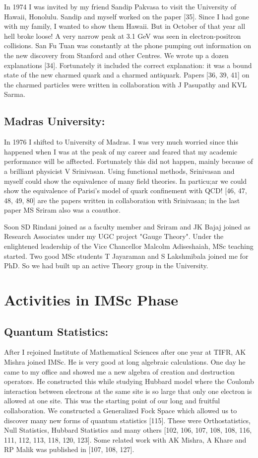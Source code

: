 In 1974 I was invited by my friend Sandip Pakvasa to visit the 
University of Hawaii, Honolulu. Sandip and myself worked on the paper 
[35]. Since I had gone with my family, I wanted to show them Hawaii. But 
in October of that year all hell broke loose! A very narrow peak at 3.1 
GeV was seen in electron-positron collisions. San Fu Tuan was constantly 
at the phone pumping out information on the new discovery from Stanford 
and other Centres. We wrote up a dozen explanations [34]. Fortunately it 
included the correct explanation: it was a bound state of the new 
charmed quark and a charmed antiquark. Papers [36, 39, 41] on the charmed 
particles were written in collaboration with J Pasupathy and KVL Sarma.

\subsection*{Madras University: }

In 1976 I shifted to University of Madras. I was very much worried since 
this happened when I was at the peak of my career and feared that my 
academic performance will be afftected. Fortunately this did not happen, 
mainly because of a brilliant physicist V Srinivasan. Using functional 
methods, Srinivasan and myself could show the equivalence of many field 
theories. In particu;ar we could show the equivalence of Parisi's model 
of quark confinement with QCD! [46, 47, 48, 49, 80] are the papers written 
in collaboration with Srinivasan; in the last paper MS Sriram also was a 
coauthor.

Soon SD Rindani joined as a faculty member and Sriram and JK Bajaj 
joined as Research Associates under my UGC project "Gauge Theory". Under 
the enlightened leadership of the Vice Chancellor Malcolm Adiseshaiah, 
MSc teaching started. Two good MSc students T Jayaraman and S 
Lakshmibala joined me for PhD. So we had built up an active Theory group 
in the University.

\section*{Activities in IMSc Phase}

\subsection*{Quantum Statistics: }

After I rejoined Institute of Mathematical Sciences after one year at 
TIFR, AK Mishra joined IMSc. He is very good at long algebraic 
calculations. One day he came to my office and showed me a new algebra 
of creation and destruction operators. He constructed this while 
studying Hubbard model where the Coulomb interaction between electrons 
at the same site is so large that only one electron is allowed at one 
site. This was the starting point of our long and fruitful 
collaboration. We constructed a Generalized Fock Space which allowed us 
to discover many new forms of quantum statistics [115]. These were 
Orthostatistics, Null Statistics, Hubbard Statistics and many others 
[102, 106, 107, 108, 108, 116, 111, 112, 113, 118, 120, 123]. Some related work 
with AK Mishra, A Khare and RP Malik was published in [107, 108, 127].

